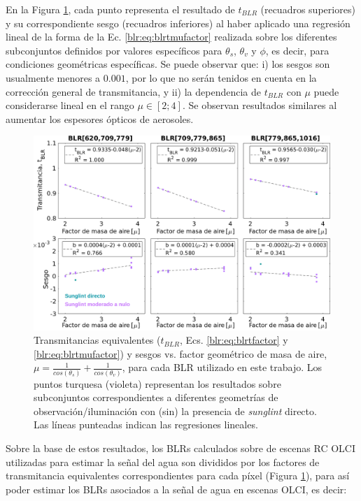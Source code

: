         En la Figura \ref{blr:tramsittance}, cada punto representa el resultado de $t_{BLR}$ (recuadros superiores) y su correspondiente sesgo (recuadros inferiores) al haber aplicado una regresión lineal de la forma de la Ec. \ref{blr:eq:blrtmufactor} realizada sobre los diferentes subconjuntos definidos por valores específicos para $\theta_{s}$, $\theta_{v}$ y $\phi$, es decir, para condiciones geométricas específicas. Se puede observar que: i) los sesgos son usualmente menores a $0.001$, por lo que no serán tenidos en cuenta en la corrección general de transmitancia, y ii) la dependencia de $t_{BLR}$ con $\mu$ puede considerarse lineal en el rango $\mu\in[2;4]$. Se observan resultados similares al aumentar los espesores ópticos de aerosoles.

        \begin{figure}
        \centering
        \includegraphics[width=\textwidth]{blr/figures/teqVsMu}
        \caption[Transmitancias equivalentes ($t_{BLR}$) y sesgos vs. factor geométrico de masa de aire para cada BLR utilizado en el esquema BLR-AC.]{Transmitancias equivalentes ($t_{BLR}$, Ecs. \ref{blr:eq:blrtfactor} y \ref{blr:eq:blrtmufactor}) y sesgos vs. factor geométrico de masa de aire, $\mu = \frac{1}{cos(\theta_{s})} + \frac{1}{cos(\theta_{v})}$, para cada BLR utilizado en este trabajo. Los puntos turquesa (violeta) representan los resultados sobre subconjuntos correspondientes a diferentes geometrías de observación/iluminación con (sin) la presencia de \textit{sunglint} directo. Las líneas punteadas indican las regresiones lineales.}
        \label{blr:tramsittance}
        \end{figure}
        
        Sobre la base de estos resultados, los BLRs calculados sobre de escenas RC OLCI utilizadas para estimar la señal del agua son divididos por los factores de transmitancia equivalentes correspondientes para cada píxel (Figura \ref{blr:tramsittance}), para así poder estimar los BLRs asociados a la señal de agua en escenas OLCI, es decir:


